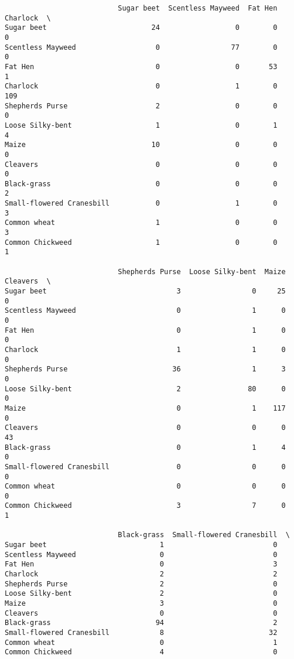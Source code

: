\documentclass[11pt]{article}
\begin{document}
    
    \begin{verbatim}
                           Sugar beet  Scentless Mayweed  Fat Hen  Charlock  \
Sugar beet                         24                  0        0         0   
Scentless Mayweed                   0                 77        0         0   
Fat Hen                             0                  0       53         1   
Charlock                            0                  1        0       109   
Shepherds Purse                     2                  0        0         0   
Loose Silky-bent                    1                  0        1         4   
Maize                              10                  0        0         0   
Cleavers                            0                  0        0         0   
Black-grass                         0                  0        0         2   
Small-flowered Cranesbill           0                  1        0         3   
Common wheat                        1                  0        0         3   
Common Chickweed                    1                  0        0         1   

                           Shepherds Purse  Loose Silky-bent  Maize  Cleavers  \
Sugar beet                               3                 0     25         0   
Scentless Mayweed                        0                 1      0         0   
Fat Hen                                  0                 1      0         0   
Charlock                                 1                 1      0         0   
Shepherds Purse                         36                 1      3         0   
Loose Silky-bent                         2                80      0         0   
Maize                                    0                 1    117         0   
Cleavers                                 0                 0      0        43   
Black-grass                              0                 1      4         0   
Small-flowered Cranesbill                0                 0      0         0   
Common wheat                             0                 0      0         0   
Common Chickweed                         3                 7      0         1   

                           Black-grass  Small-flowered Cranesbill  \
Sugar beet                           1                          0   
Scentless Mayweed                    0                          0   
Fat Hen                              0                          3   
Charlock                             2                          2   
Shepherds Purse                      2                          0   
Loose Silky-bent                     2                          0   
Maize                                3                          0   
Cleavers                             0                          0   
Black-grass                         94                          2   
Small-flowered Cranesbill            8                         32   
Common wheat                         0                          1   
Common Chickweed                     4                          0   


\end{verbatim}
\end{document}
